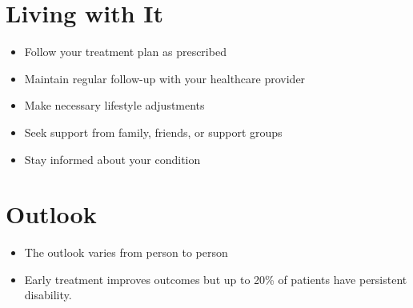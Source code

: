 \section{Living with It}
\begin{itemize}[noitemsep]
  \item Follow your treatment plan as prescribed
  \item Maintain regular follow-up with your healthcare provider
  \item Make necessary lifestyle adjustments
  \item Seek support from family, friends, or support groups
  \item Stay informed about your condition
\end{itemize}
\section{Outlook}
\begin{itemize}[noitemsep]
  \item The outlook varies from person to person
  \item Early treatment improves outcomes but up to 20\% of patients have persistent disability.
\end{itemize}
